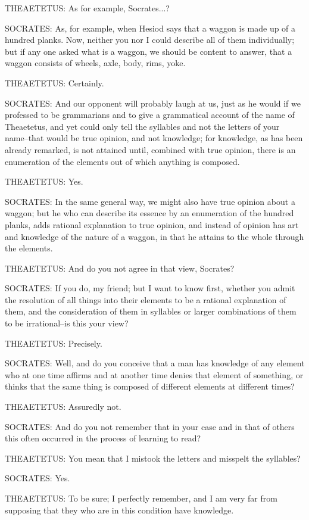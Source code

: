 THEAETETUS: As for example, Socrates...?

SOCRATES: As, for example, when Hesiod says that a waggon is made up
of a hundred planks. Now, neither you nor I could describe all of
them individually; but if any one asked what is a waggon, we should be
content to answer, that a waggon consists of wheels, axle, body, rims,
yoke.

THEAETETUS: Certainly.

SOCRATES: And our opponent will probably laugh at us, just as he would
if we professed to be grammarians and to give a grammatical account of
the name of Theaetetus, and yet could only tell the syllables and not
the letters of your name--that would be true opinion, and not knowledge;
for knowledge, as has been already remarked, is not attained until,
combined with true opinion, there is an enumeration of the elements out
of which anything is composed.

THEAETETUS: Yes.

SOCRATES: In the same general way, we might also have true opinion about
a waggon; but he who can describe its essence by an enumeration of the
hundred planks, adds rational explanation to true opinion, and instead
of opinion has art and knowledge of the nature of a waggon, in that he
attains to the whole through the elements.

THEAETETUS: And do you not agree in that view, Socrates?

SOCRATES: If you do, my friend; but I want to know first, whether you
admit the resolution of all things into their elements to be a rational
explanation of them, and the consideration of them in syllables or
larger combinations of them to be irrational--is this your view?

THEAETETUS: Precisely.

SOCRATES: Well, and do you conceive that a man has knowledge of any
element who at one time affirms and at another time denies that element
of something, or thinks that the same thing is composed of different
elements at different times?

THEAETETUS: Assuredly not.

SOCRATES: And do you not remember that in your case and in that of
others this often occurred in the process of learning to read?

THEAETETUS: You mean that I mistook the letters and misspelt the
syllables?

SOCRATES: Yes.

THEAETETUS: To be sure; I perfectly remember, and I am very far from
supposing that they who are in this condition have knowledge.

